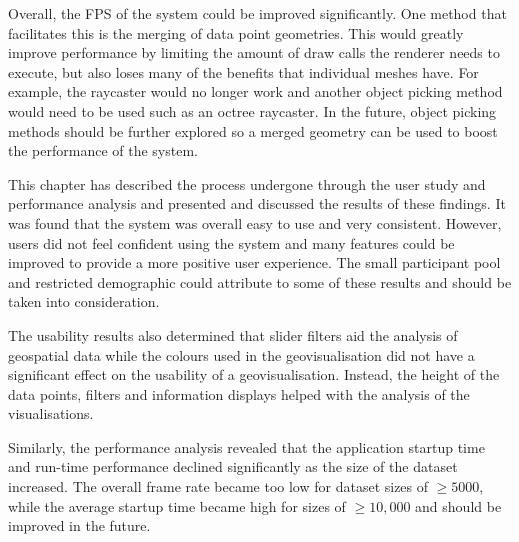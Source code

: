 {{		Overall, the FPS of the system could be improved significantly. One method that facilitates this is the merging of data point geometries. This would greatly improve performance by limiting the amount of draw calls the renderer needs to execute, but also loses many of the benefits that individual meshes have. For example, the raycaster would no longer work and another object picking method would need to be used such as an octree raycaster. In the future, object picking methods should be further explored so a merged geometry can be used to boost the performance of the system.

	}

}

This chapter has described the process undergone through the user study and performance analysis and presented and discussed the results of these findings. It was found that the system was overall easy to use and very consistent. However, users did not feel confident using the system and many features could be improved to provide a more positive user experience. The small participant pool and restricted demographic could attribute to some of these results and should be taken into consideration. 

The usability results also determined that slider filters aid the analysis of geospatial data while the colours used in the geovisualisation did not have a significant effect on the usability of a geovisualisation. Instead, the height of the data points, filters and information displays helped with the analysis of the visualisations. 

Similarly, the performance analysis revealed that the application startup time and run-time performance declined significantly as the size of the dataset increased. The overall frame rate became too low for dataset sizes of $\geqslant5000$, while the average startup time became high for sizes of $\geqslant10, 000$ and should be improved in the future.
